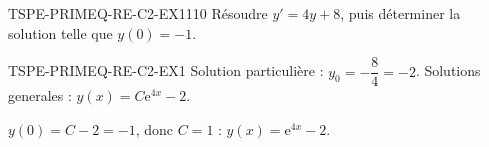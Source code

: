 

\begin{exercice}{TSPE-PRIMEQ-RE-C2-EX1}{1}{10}
Résoudre $y' = 4y + 8$, puis déterminer la solution telle que $y(0)=-1$.
\end{exercice}


\begin{corrige}{TSPE-PRIMEQ-RE-C2-EX1}
Solution particulière : $y_0 = -\dfrac{8}{4} = -2$. Solutions generales : $y(x) = C\mathrm{e}^{4x} - 2$.

$y(0) = C-2 = -1$, donc $C=1$ : $y(x) = \mathrm{e}^{4x} - 2$.
\end{corrige}
